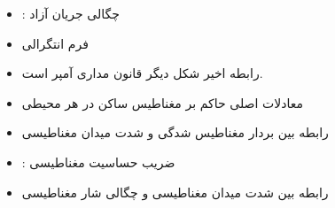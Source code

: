 \begin{ELimportant}{}


\end{ELimportant}

\begin{ELjoin}

\begin{itemize}
\tightlist
\item
  : چگالی جریان آزاد
\item
  فرم انتگرالی
\end{itemize}


\begin{itemize}
\tightlist
\item
  رابطه اخیر شکل دیگر قانون مداری آمپر است.
\item
  معادلات اصلی حاکم بر مغناطیس ساکن در هر محیطی
\end{itemize}

\begin{ELimportant}{}


\end{ELimportant}

\end{ELjoin}

\ELhold


\begin{ELjoin}

\begin{itemize}
\tightlist
\item
  رابطه بین بردار مغناطیس شدگی و شدت میدان مغناطیسی
\end{itemize}


\begin{itemize}
\tightlist
\item
  : ضریب حساسیت مغناطیسی
\item
  رابطه بین شدت میدان مغناطیسی و چگالی شار مغناطیسی
\end{itemize}

\begin{ELimportant}{}


\end{ELimportant}

\end{ELjoin}

